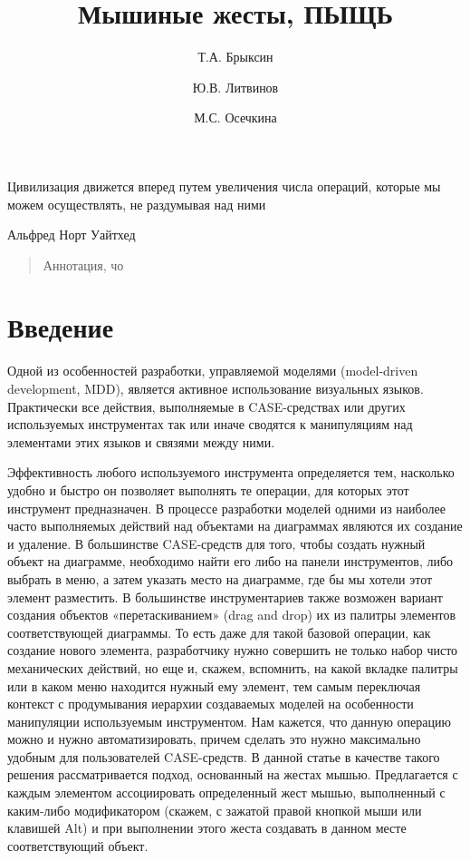 \documentclass[a5paper]{article}
\title{Мышиные жесты, ПЫЩЬ}
\author{Т.А. Брыксин \and Ю.В. Литвинов \and М.С. Осечкина}
\date{}
\begin{document}
\maketitle
\thispagestyle{empty}

\epigraph{Цивилизация движется вперед путем увеличения числа операций, которые мы можем осуществлять, не раздумывая над ними}%
         {Альфред Норт Уайтхед}

\begin{quote}
\small\noindent
Аннотация, чо
\end{quote}

\section*{Введение}
Одной из особенностей разработки, управляемой моделями (model-driven development, MDD), является активное использование 
визуальных языков. Практически все действия, выполняемые в CASE-средствах или других используемых инструментах так или 
иначе сводятся к манипуляциям над элементами этих языков и связями между ними. 

Эффективность любого используемого инструмента определяется тем, насколько удобно и быстро он позволяет выполнять те операции, 
для которых этот инструмент предназначен. В процессе разработки моделей одними из наиболее часто выполняемых действий над объектами 
на диаграммах являются их создание и удаление.  В большинстве CASE-средств для того, чтобы создать нужный объект на диаграмме, 
необходимо найти его либо на панели инструментов, либо выбрать в меню, а затем указать место на диаграмме, где бы мы хотели этот 
элемент разместить. В большинстве инструментариев также возможен вариант создания объектов «перетаскиванием» (drag and drop) их из 
палитры элементов соответствующей диаграммы. То есть даже для такой базовой операции, как создание нового элемента, разработчику нужно 
совершить не только набор чисто механических действий, но еще и, скажем, вспомнить, на какой вкладке палитры или в каком меню находится 
нужный ему элемент, тем самым переключая контекст с продумывания иерархии создаваемых моделей на особенности манипуляции 
используемым инструментом. Нам кажется, что данную операцию можно и нужно автоматизировать, причем сделать это нужно максимально удобным для 
пользователей CASE-средств. В данной статье в качестве такого решения рассматривается подход, основанный на жестах мышью. 
Предлагается с каждым элементом ассоциировать определенный жест мышью, выполненный с каким-либо модификатором (скажем, с зажатой 
правой кнопкой мыши или клавишей Alt) и при выполнении этого жеста создавать в данном месте соответствующий объект. 
\end{document}
